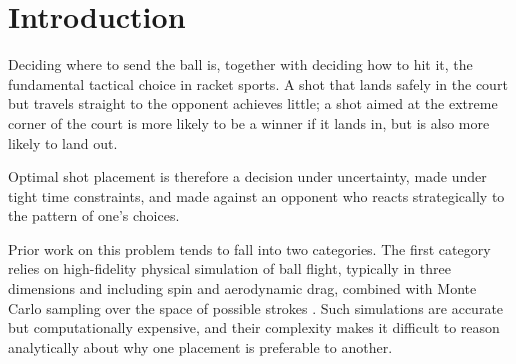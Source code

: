   \maketitle



  \section{Introduction}\label{sec:intro}

  Deciding where to send the ball is, together with deciding how to hit it, the
  fundamental tactical choice in racket sports. A shot that lands safely in the
  court but travels straight to the opponent achieves little; a shot aimed at
  the extreme corner of the court is more likely to be a winner if it lands in,
  but is also more likely to land out.

  Optimal shot placement is therefore a decision under uncertainty, made under
  tight time constraints, and made against an opponent who reacts strategically
  to the pattern of one's choices.

  Prior work on this problem tends to fall into two categories. The first
  category relies on high-fidelity physical simulation of ball flight, typically
  in three dimensions and including spin and aerodynamic drag, combined with
  Monte Carlo sampling over the space of possible strokes \cite{cross2014drag}.
  Such simulations are accurate but computationally expensive, and their
  complexity makes it difficult to reason analytically about why one placement
  is preferable to another.

